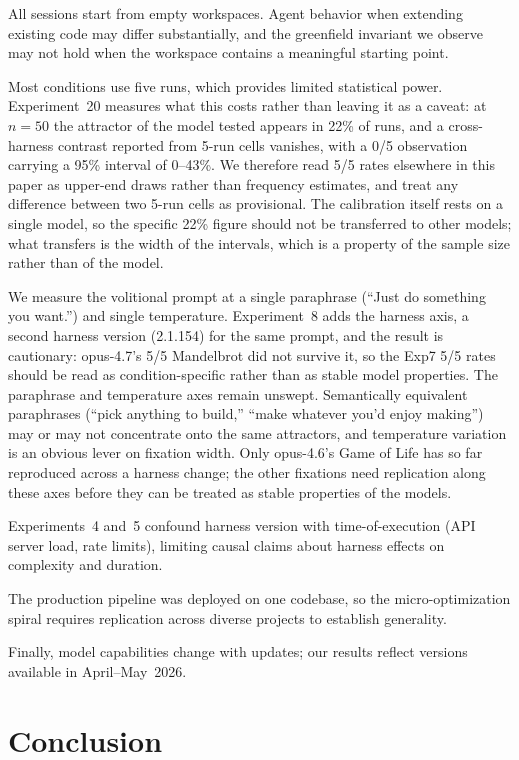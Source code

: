 \documentclass{article}
\begin{document}
All sessions start from empty workspaces. Agent behavior when
extending existing code may differ substantially, and the
greenfield invariant we observe may not hold when the workspace
contains a meaningful starting point.

Most conditions use five runs, which provides limited statistical
power. Experiment~20 measures what this costs rather than leaving
it as a caveat: at $n=50$ the attractor of the model tested
appears in 22\% of runs, and a cross-harness contrast reported
from 5-run cells vanishes, with a 0/5 observation carrying a 95\%
interval of 0--43\%. We therefore read 5/5 rates elsewhere in this
paper as upper-end draws rather than frequency estimates, and
treat any difference between two 5-run cells as provisional.
The calibration itself rests on a single model, so the specific
22\% figure should not be transferred to other models; what
transfers is the width of the intervals, which is a property of
the sample size rather than of the model.

We measure the volitional prompt at a single paraphrase (``Just
do something you want.'') and single temperature. Experiment~8
adds the harness axis, a second harness version (2.1.154)
for the same prompt, and the result is cautionary: opus-4.7's
5/5 Mandelbrot did not survive it, so the Exp7 5/5 rates should
be read as condition-specific rather than as stable model
properties. The paraphrase and temperature axes remain
unswept. Semantically equivalent paraphrases (``pick anything
to build,'' ``make whatever you'd enjoy making'') may or may not
concentrate onto the same attractors, and temperature variation
is an obvious lever on fixation width. Only opus-4.6's Game of
Life has so far reproduced across a harness change; the other
fixations need replication along these axes before they can be
treated as stable properties of the models.

Experiments~4 and~5 confound harness version with
time-of-execution (API server load, rate limits), limiting causal
claims about harness effects on complexity and duration.

The production pipeline was deployed on one codebase, so the
micro-optimization spiral requires replication across diverse
projects to establish generality.

Finally, model capabilities change with updates; our results
reflect versions available in April--May~2026.

\section{Conclusion}
\label{sec:conclusion}
\end{document}
